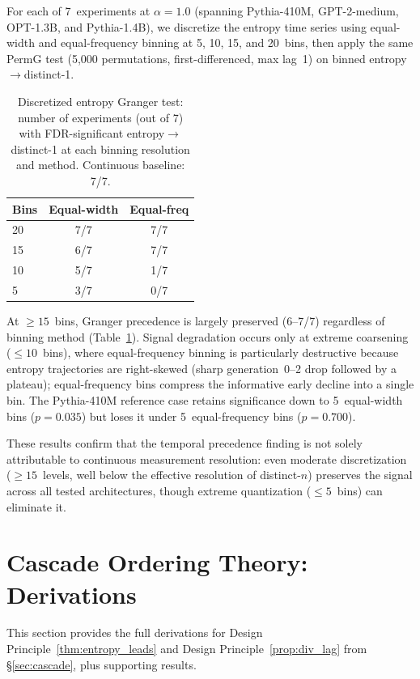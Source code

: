 For each of 7~experiments at $\alpha{=}1.0$ (spanning Pythia-410M, GPT-2-medium, OPT-1.3B, and Pythia-1.4B), we discretize the entropy time series using equal-width and equal-frequency binning at 5, 10, 15, and 20~bins, then apply the same PermG test (5{,}000 permutations, first-differenced, max lag~1) on binned entropy$\to$distinct-1.

\begin{table}[t]
\centering
\small
\caption{Discretized entropy Granger test: number of experiments (out of 7) with FDR-significant entropy$\to$distinct-1 at each binning resolution and method. Continuous baseline: 7/7.}
\label{tab:discretized_entropy}
\begin{tabular}{@{}lcc@{}}
\toprule
Bins & Equal-width & Equal-freq \\
\midrule
20 & 7/7 & 7/7 \\
15 & 6/7 & 7/7 \\
10 & 5/7 & 1/7 \\
5  & 3/7 & 0/7 \\
\bottomrule
\end{tabular}
\end{table}

At ${\geq}15$~bins, Granger precedence is largely preserved (6--7/7) regardless of binning method (Table~\ref{tab:discretized_entropy}).
Signal degradation occurs only at extreme coarsening (${\leq}10$~bins), where equal-frequency binning is particularly destructive because entropy trajectories are right-skewed (sharp generation~0--2 drop followed by a plateau); equal-frequency bins compress the informative early decline into a single bin.
The Pythia-410M reference case retains significance down to 5~equal-width bins ($p{=}0.035$) but loses it under 5~equal-frequency bins ($p{=}0.700$).

These results confirm that the temporal precedence finding is not solely attributable to continuous measurement resolution: even moderate discretization (${\geq}15$~levels, well below the effective resolution of distinct-$n$) preserves the signal across all tested architectures, though extreme quantization (${\leq}5$~bins) can eliminate it.


\section{Cascade Ordering Theory: Derivations}
\label{app:cascade_theory}

This section provides the full derivations for Design Principle~\ref{thm:entropy_leads} and Design Principle~\ref{prop:div_lag} from \S\ref{sec:cascade}, plus supporting results.

